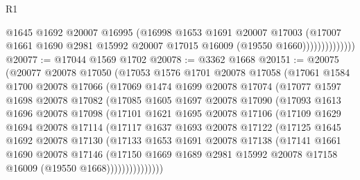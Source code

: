 \begin{lexlean}{R1}
\begin{coremodule}
                          @1645
                          @1692
                          @20007
                          @16995
                          (@16998
                            @1653
                            @1691
                            @20007
                            @17003
                            (@17007
                              @1661
                              @1690
                              @2981
                              @15992
                              @20007
                              @17015
                              @16009
                              (@19550 @1660))))))))))))))
@20077 := @17044 @1569 @1702
@20078 := @3362 @1668
@20151 := @20075
    (@20077
      @20078
      @17050
      (@17053
        @1576
        @1701
        @20078
        @17058
        (@17061
          @1584
          @1700
          @20078
          @17066
          (@17069
            @1474
            @1699
            @20078
            @17074
            (@17077
              @1597
              @1698
              @20078
              @17082
              (@17085
                @1605
                @1697
                @20078
                @17090
                (@17093
                  @1613
                  @1696
                  @20078
                  @17098
                  (@17101
                    @1621
                    @1695
                    @20078
                    @17106
                    (@17109
                      @1629
                      @1694
                      @20078
                      @17114
                      (@17117
                        @1637
                        @1693
                        @20078
                        @17122
                        (@17125
                          @1645
                          @1692
                          @20078
                          @17130
                          (@17133
                            @1653
                            @1691
                            @20078
                            @17138
                            (@17141
                              @1661
                              @1690
                              @20078
                              @17146
                              (@17150
                                @1669
                                @1689
                                @2981
                                @15992
                                @20078
                                @17158
                                @16009
                                (@19550 @1668)))))))))))))))

\end{coremodule}
\end{lexlean}
